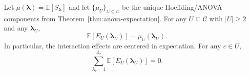 \begin{corollary}
\label{cor:paired-interaction-anova}
Let $\mu(\boldsymbol{\lambda})=\mathbb{E}[S_{\boldsymbol{\lambda}}]$ and let
$\{\mu_U\}_{U\subseteq\mathcal{C}}$ be the unique Hoeffding/ANOVA components from
Theorem~\ref{thm:anova-expectation}. For any $U\subseteq\mathcal{C}$ with
$|U|\ge 2$ and any $\boldsymbol{\lambda}_U$,
\begin{equation}
\label{eq:paired-interaction-anova}
\mathbb{E}\!\left[E_U(\boldsymbol{\lambda}_U)\right]
=
\mu_U(\boldsymbol{\lambda}_U).
\end{equation}
In particular, the interaction effects are centered in expectation. For any
$c\in U$,
\begin{equation}
\label{eq:paired-interaction-sum-to-zero}
\sum_{\lambda_c=1}^{\Lambda_c}
\mathbb{E}\!\left[E_U(\boldsymbol{\lambda}_U)\right]
=
0.
\end{equation}
\end{corollary}

